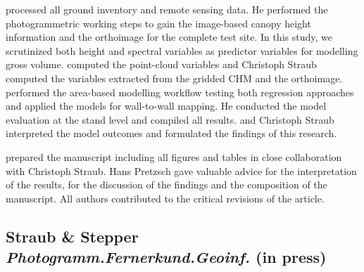 \begin{description}
		\myName processed all ground inventory and remote sensing data. He performed the photogrammetric working steps
		to gain the image-based canopy height information and the orthoimage for the complete test site. 
		In this study, we scrutinized both height and spectral variables as predictor variables for modelling gross volume.
		\myName computed the point-cloud variables and Christoph Straub computed the variables extracted from the gridded \ac{CHM} and the orthoimage.
		\myName performed the area-based modelling workflow testing both regression approaches and applied the models for wall-to-wall mapping. 
		He conducted the model evaluation at the stand level and compiled all results. \myName and Christoph Straub interpreted the model outcomes
		and formulated the findings of this research.
	
		\myName prepared the manuscript including all figures and tables in close collaboration with Christoph Straub.
		Hans Pretzsch gave valuable advice for the interpretation of the results, for the discussion of the findings 
		and the composition of the manuscript. All authors contributed to the critical revisions of the article.
	
\end{description}


\subsection[Straub \& Stepper \emph{Photogramm.\:Fernerkund.\:Geoinf.} (in press)]
{Straub \& Stepper\; 
	\emph{Photogramm.\:Fernerkund.\:Geoinf.}
	(in press) }
\label{sec:pub.PFG2016}


